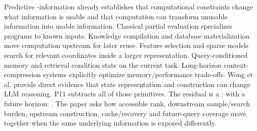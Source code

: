 \markdownRendererDocumentBegin
\markdownRendererSectionBegin
{}\markdownRendererInterblockSeparator
{}Predictive -information already establishes that computational constraints change what information is usable and that computation can transform unusable information into usable information. Classical partial evaluation specializes programs to known inputs. Knowledge compilation and database materialization move computation upstream for later reuse. Feature selection and sparse models search for relevant coordinates inside a larger representation. Query-conditioned memory and retrieval condition state on the current task. Long-horizon context-compression systems explicitly optimize memory/performance trade-offs. Wong et al. provide direct evidence that state representation and construction can change LLM reasoning.\markdownRendererInterblockSeparator
{}P11 subtracts all of those primitives.\markdownRendererInterblockSeparator
{}The residual is a :\markdownRendererInterblockSeparator
{}\markdownRendererInterblockSeparator
{}with a future horizon:\markdownRendererInterblockSeparator
{}.\markdownRendererInterblockSeparator
{}The paper asks how accessible rank, downstream sample/search burden, upstream construction, cache/recovery and future-query coverage move together when the same underlying information is exposed differently.
\markdownRendererSectionEnd \markdownRendererDocumentEnd